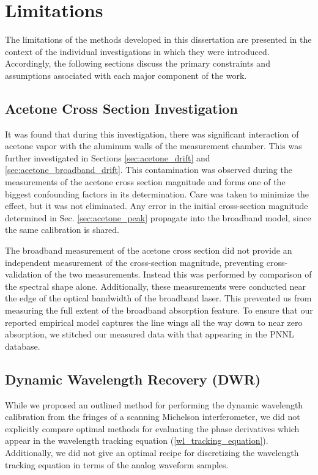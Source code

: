 \documentclass[8pt,a4paper]{report}
\begin{document}
	\section{Limitations}
	The limitations of the methods developed in this dissertation are presented in the context of the individual investigations in which they were introduced. Accordingly, the following sections discuss the primary constraints and assumptions associated with each major component of the work.
	
	\subsection{Acetone Cross Section Investigation}
	It was found that during this investigation, there was significant interaction of acetone vapor with the aluminum walls of the measurement chamber. This was further investigated in Sections \ref{sec:acetone_drift} and \ref{sec:acetone_broadband_drift}. This contamination was observed during the measurements of the acetone cross section magnitude and forms one of the biggest confounding factors in its determination. Care was taken to minimize the effect, but it was not eliminated. Any error in the initial cross-section magnitude determined in Sec. \ref{sec:acetone_peak} propagate into the broadband model, since the same calibration is shared.
	
	The broadband measurement of the acetone cross section did not provide an independent measurement of the cross-section magnitude, preventing cross-validation of the two measurements. Instead this was performed by comparison of the spectral shape alone. Additionally, these measurements were conducted near the edge of the optical bandwidth of the broadband laser. This prevented us from measuring the full extent of the broadband absorption feature. To ensure that our reported empirical model captures the line wings all the way down to near zero absorption, we stitched our measured data with that appearing in the PNNL database.
	
	\subsection{Dynamic Wavelength Recovery (DWR)}
	While we proposed an outlined method for performing the dynamic wavelength calibration from the fringes of a scanning Michelson interferometer, we did not explicitly compare optimal methods for evaluating the phase derivatives which appear in the wavelength tracking equation (\ref{wl_tracking_equation}). Additionally, we did not give an optimal recipe for discretizing the wavelength tracking equation in terms of the analog waveform samples.
	
\end{document}
